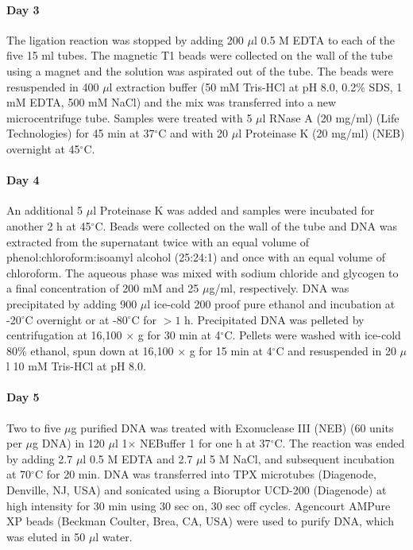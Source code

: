 \documentclass{article}
\begin{document}
\paragraph{Day 3}
The ligation reaction was stopped by adding 200 $\mu$l 0.5 M EDTA to each
of the five 15 ml tubes. The magnetic T1 beads were collected on the
wall of the tube using a magnet and the solution was aspirated out of
the tube. The beads were resuspended in 400 $\mu$l extraction buffer (50
mM Tris-HCl at pH 8.0, 0.2\% SDS, 1 mM EDTA, 500 mM NaCl) and the mix
was transferred into a new microcentrifuge tube. Samples were treated
with 5 $\mu$l RNase A (20 mg/ml) (Life Technologies) for 45 min at 37$^\circ$C
and with 20 $\mu$l Proteinase K (20 mg/ml) (NEB) overnight at 45$^\circ$C.

\paragraph{Day 4}
An additional 5 $\mu$l Proteinase K was added and samples were incubated
for another 2 h at 45$^\circ$C. Beads were collected on the wall of the tube
and DNA was extracted from the supernatant twice with an equal volume
of phenol:chloroform:isoamyl alcohol (25:24:1) and once with an equal
volume of chloroform. The aqueous phase was mixed with sodium chloride
and glycogen to a final concentration of 200 mM and 25 $\mu$g/ml,
respectively. DNA was precipitated by adding 900 $\mu$l ice-cold 200 proof
pure ethanol and incubation at -20$^\circ$C overnight or at -80$^\circ$C for
$>1$ h. Precipitated DNA was pelleted by centrifugation at 16,100 $\times$ g
for 30 min at 4$^\circ$C. Pellets were washed with ice-cold 80\% ethanol,
spun down at 16,100 $\times$ g for 15 min at 4$^\circ$C and resuspended in 20 $\mu$l 10
mM Tris-HCl at pH 8.0.

\paragraph{Day 5}
Two to five $\mu$g purified DNA was treated with Exonuclease III (NEB) (60
units per $\mu$g DNA) in 120 $\mu$l 1$\times$ NEBuffer 1 for one h at 37$^\circ$C. The
reaction was ended by adding 2.7 $\mu$l 0.5 M EDTA and 2.7 $\mu$l 5 M NaCl,
and subsequent incubation at 70$^\circ$C for 20 min. DNA was transferred into
TPX microtubes (Diagenode, Denville, NJ, USA) and sonicated using a
Bioruptor UCD-200 (Diagenode) at high intensity for 30 min using 30
sec on, 30 sec off cycles. Agencourt AMPure XP beads (Beckman Coulter,
Brea, CA, USA) were used to purify DNA, which was eluted in 50 $\mu$l
water.
\end{document}
